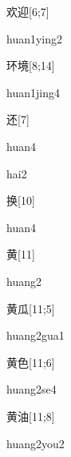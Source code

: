 \begin{verbete}{欢迎}[6;7]
\begin{pronuncia}{huan1ying2}
\end{pronuncia}
\end{verbete}

\begin{verbete}{环境}[8;14]
\begin{pronuncia}{huan1jing4}
\end{pronuncia}
\end{verbete}

\begin{verbete}[huan4]{还}[7]
\begin{pronuncia}{huan4}
\end{pronuncia}
\begin{pronuncia}{hai2}
\end{pronuncia}
\end{verbete}

\begin{verbete}[huan4]{换}[10]
\begin{pronuncia}{huan4}
\end{pronuncia}
\end{verbete}

\begin{verbete}[huang2]{黄}[11]
\begin{pronuncia}{huang2}
\end{pronuncia}
\end{verbete}

\begin{verbete}{黄瓜}[11;5]
\begin{pronuncia}{huang2gua1}
\end{pronuncia}
\end{verbete}

\begin{verbete}[huang2se4]{黄色}[11;6]
\begin{pronuncia}{huang2se4}
\end{pronuncia}
\end{verbete}

\begin{verbete}{黄油}[11;8]
\begin{pronuncia}{huang2you2}
\end{pronuncia}
\end{verbete}


